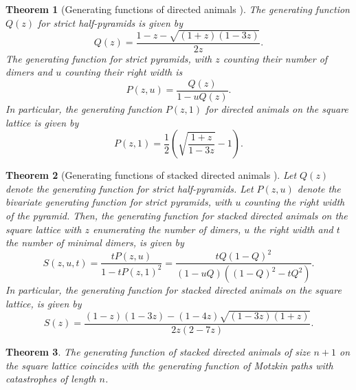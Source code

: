 \documentclass{article}
\newtheorem{theorem}{Theorem}
\theoremstyle{definition}
\begin{document}
\begin{theorem}[Generating functions of directed animals {\cite[Proposition 1]{LatticeAnimals}}]\label{thm:gf_directed_animals}
  The generating function $Q(z)$ for strict half-pyramids is given by
  \[
    Q(z) = \frac{1 - z - \sqrt{(1+z)(1-3z)}}{2z}.
  \]
  The generating function for strict pyramids, with $z$ counting their number of dimers and $u$ counting their right width is
  \begin{equation} \label{eq:gf_pyramids}
    P(z,u) = \frac{Q(z)}{1 - uQ(z)}.
  \end{equation}
  In particular, the generating function $P(z,1)$ for directed animals on the square lattice is given by
  \[
    P(z,1) = \frac{1}{2}\left(\sqrt{\frac{1+z}{1-3z}}-1\right).
  \]
\end{theorem}

\begin{theorem}[Generating functions of stacked directed animals {\cite[Proposition 2]{LatticeAnimals}}]
  Let $Q(z)$ denote the generating function for strict half-pyramids. Let $P(z,u)$ denote the bivariate generating function for strict pyramids, with $u$ counting the right width of the pyramid. Then, the generating function for stacked directed animals on the square lattice with $z$ enumerating the number of dimers, $u$ the right width and $t$ the number of minimal dimers, is given by
  \[
    S(z,u,t) = \frac{t P(z,u)}{1 - t P(z,1)^2} 
    = \frac{t Q(1 - Q)^2}{(1 - uQ)((1- Q)^2 - tQ^2)}.
  \]
  In particular, the generating function for stacked directed animals on the square lattice, is given by 
  \[
    S(z) = \frac{(1-z)(1-3z) - (1-4z)\sqrt{(1-3z)(1+z)}}{2z(2 - 7z)}.
  \]
\end{theorem}

\begin{theorem}
  The generating function of stacked directed animals of size $n+1$ on the square lattice coincides with the generating function of Motzkin paths with catastrophes of length $n$.
\end{theorem}
\end{document}
